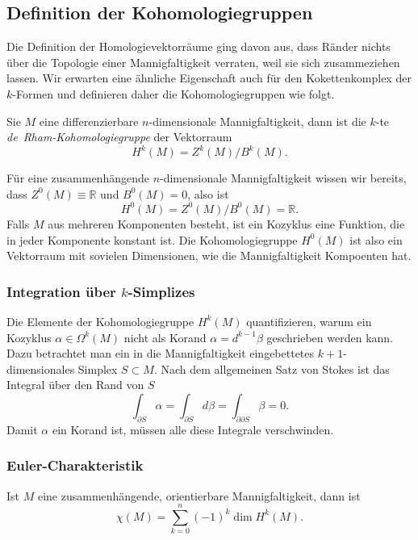 %
%
\subsection{Definition der Kohomologiegruppen}
Die Definition der Homologievektorräume ging davon aus, dass Ränder
nichts über die Topologie einer Mannigfaltigkeit verraten, weil sie
sich zusammeziehen lassen.
Wir erwarten eine ähnliche Eigenschaft auch für den Kokettenkomplex
der $k$-Formen und definieren daher die Kohomologiegruppen wie 
folgt.

\begin{definition}
Sie $M$ eine differenzierbare $n$-dimensionale Mannigfaltigkeit, dann
ist die $k$-te \emph{de~Rham-Kohomologiegruppe} der Vektorraum
%
\[
H^k(M)
=
Z^k(M) / B^k(M).
\]
\end{definition}

Für eine zusammenhängende $n$-dimensionale Mannigfaltigkeit wissen wir
bereits, dass $Z^0(M)\equiv\mathbb{R}$ und $B^0(M)=0$, also ist
\[
H^0(M) = Z^0(M) / B^0(M) = \mathbb{R}.
\]
Falls $M$ aus mehreren Komponenten besteht, ist ein Kozyklus eine
Funktion, die in jeder Komponente konstant ist.
Die Kohomologiegruppe $H^0(M)$ ist also ein Vektorraum mit sovielen
Dimensionen, wie die Mannigfaltigkeit Kompoenten hat.

%
%
\subsubsection{Integration über $k$-Simplizes}
Die Elemente der Kohomologiegruppe $H^k(M)$ quantifizieren, warum
ein Kozyklus $\alpha\in \Omega^k(M)$ nicht als Korand $\alpha=d^{k-1}\beta$
geschrieben werden kann.
Dazu betrachtet man ein in die Mannigfaltigkeit eingebettetes
$k+1$-dimensionales Simplex $S\subset M$.
Nach dem allgemeinen Satz von Stokes ist das Integral über den Rand von
$S$
\[
\int_{\partial S} \alpha
=
\int_{\partial S} d\beta
=
\int_{\partial\partial S}\beta
=
0.
\]
Damit $\alpha$ ein Korand ist, müssen alle diese Integrale verschwinden.

%
%
\subsubsection{Euler-Charakteristik}

\begin{satz}
Ist $M$ eine zusammenhängende, orientierbare Mannigfaltigkeit, dann ist
\[
\chi(M)
=
\sum_{k=0}^n (-1)^k \dim H^k(M).
\]
\end{satz}

